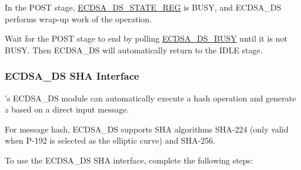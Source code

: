 \documentclass[main\_\_EN.tex]{subfiles}
\begin{document}
In the POST stage, \hyperref[regdesc:ECDSADSSTATEREG]{ECDSA\_DS\_STATE\_REG} is BUSY, and ECDSA\_DS performs wrap-up work of the operation.

Wait for the POST stage to end by polling \hyperref[fielddesc:ECDSADSBUSY]{ECDSA\_DS\_BUSY} until it is not BUSY. Then ECDSA\_DS will automatically return to the IDLE stage.

\subsubsection{ECDSA\_DS SHA Interface}
\label{sec:ecdsa-sha-interface}

\chipseries{}'s ECDSA\_DS module can automatically execute a hash operation and generate $z$ based on a direct input message.

For message hash, ECDSA\_DS supports SHA algorithms SHA-224 (only valid when P-192 is selected as the elliptic curve) and SHA-256.

To use the ECDSA\_DS SHA interface, complete the following steps:
\end{document}
